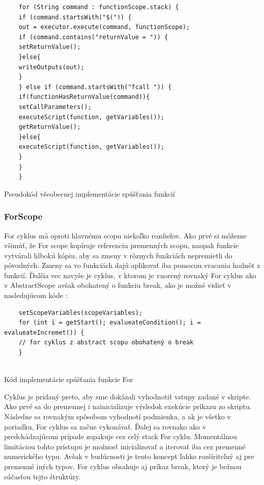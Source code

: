 {\begin{algorithm}[H]
\begin{verbatim}
	for (String command : functionScope.stack) {
	if (command.startsWith("$(")) {
	out = executor.execute(command, functionScope);
	if (command.contains("returnValue = ")) {
	setReturnValue();
	}else{
	writeOutputs(out);
	}
	} else if (command.startsWith("fcall ")) {
	if(functionHasReturnValue(command)){
	setCallParameters();
	executeScript(function, getVariables());
	getReturnValue();
	}else{
	executeScript(function, getVariables());
	}
	}
	}
	\end{verbatim}
	\caption{Pseudokód všeobecnej implementácie spúšťania funkcií}
	\label{alg:gen}
\end{algorithm}
\subsubsection{ForScope}
\indent For cyklus má oproti hlavnému scopu niekoľko rozdielov. Ako prvé si môžeme všimúť, že For scope kopíruje referenciu premenných scopu, naopak funkcie vytvárali hlbokú kópiu, aby sa zmeny v rôznych funkciách nepremietli do pôvodných. Zmeny sa vo funkciách dajú aplikovať iba pomocou vracania hodnôt z funkcií. Ďalšia vec navyše je cyklus, v ktorom je vnorený rovnaký For cyklus ako v AbstractScope avšak obohatený o funkciu break, ako je možné vidieť v nasledujúcom kóde :
\begin{algorithm}[H]
	\begin{verbatim}
	setScopeVariables(scopeVariables);
	for (int i = getStart(); evalueateCondition(); i = evalueateIncremet()) {
	// for cyklus z abstract scopu obohatený o break
	}
	
	\end{verbatim}
	\caption{Kód implementácie spúšťania funkcie For}
	\label{alg:gen}
\end{algorithm}
\indent Cyklus je pridaný preto, aby sme dokázali vyhodnotiť vstupy zadané v skripte. Ako prvé sa do premennej i nainicializuje výsledok exekúcie príkazu zo skriptu. Následne sa rovnakým spôsobom vyhodnotí podmienka, a ak je všetko v poriadku, For cyklus sa začne vykonávať. Ďalej sa rovnako ako v predchádzajúcom prípade zopakuje cez celý stack For cyklu. Momentálnou limitáciou tohto prístupu je možnosť inicializovať a iterovať iba cez premenné numerického typu. Avšak v budúcnosti je tento koncept ľahko rozšíriteľný aj pre premenné iných typov. For cyklus obsahuje aj príkaz break, ktorý je bežnou súčasťou tejto štruktúry.
}

